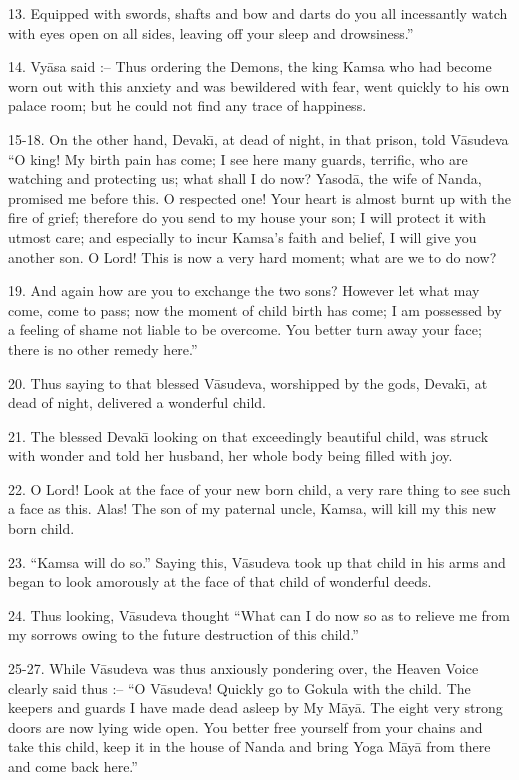 13. Equipped with swords, shafts and bow and darts do you all incessantly watch with eyes open on all sides, leaving off your sleep and drowsiness.''

14. Vy\=asa said :-- Thus ordering the Demons, the king Kamsa who had become worn out with this anxiety and was bewildered with fear, went quickly to his own palace room; but he could not find any trace of happiness.

15-18. On the other hand, Devak\={\i}, at dead of night, in that prison, told V\=asudeva ``O king! My birth pain has come; I see here many guards, terrific, who are watching and protecting us; what shall I do now? Yasod\=a, the wife of Nanda, promised me before this. O respected one! Your heart is almost burnt up with the fire of grief; therefore do you send to my house your son; I will protect it with utmost care; and especially to incur Kamsa's faith and belief, I will give you another son. O Lord! This is now a very hard moment; what are we to do now?

19. And again how are you to exchange the two sons? However let what may come, come to pass; now the moment of child birth has come; I am possessed by a feeling of shame not liable to be overcome. You better turn away your face; there is no other remedy here.''

20. Thus saying to that blessed V\=asudeva, worshipped by the gods, Devak\={\i}, at dead of night, delivered a wonderful child.

21. The blessed Devak\={\i} looking on that exceedingly beautiful child, was struck with wonder and told her husband, her whole body being filled with joy.

22. O Lord! Look at the face of your new born child, a very rare thing to see such a face as this. Alas! The son of my paternal uncle, Kamsa, will kill my this new born child.

23. ``Kamsa will do so.'' Saying this, V\=asudeva took up that child in his arms and began to look amorously at the face of that child of wonderful deeds.

24. Thus looking, V\=asudeva thought ``What can I do now so as to relieve me from my sorrows owing to the future destruction of this child.''

25-27. While V\=asudeva was thus anxiously pondering over, the Heaven Voice clearly said thus :-- ``O V\=asudeva! Quickly go to Gokula with the child. The keepers and guards I have made dead asleep by My M\=ay\=a. The eight very strong doors are now lying wide open. You better free yourself from your chains and take this child, keep it in the house of Nanda and bring Yoga M\=ay\=a from there and come back here.''


